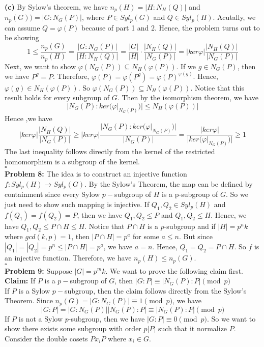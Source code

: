 \documentclass[12pt]{amsart}
\begin{document}
\\\textbf{(c)} By Sylow's theorem, we have $n_p(H)=|H:N_H(Q)|$ and $n_p(G))=|G:N_G(P)|$, where $P\in Syl_p(G)$ and $Q\in Syl_p(H)$. Acutally, we can assume $Q=\varphi(P)$ because of part 1 and 2. Hence, the problem turns out to be showing 
$$1\leq \frac{n_p(G)}{n_p(H)}=\frac{|G:N_G(P)|}{|H:N_H(Q)|}=\frac{|G|}{|H|}\cdot \frac{|N_H(Q)|}{|N_G(P)|}=|ker\varphi|\frac{|N_H(Q)|}{|N_G(P)|}$$
Next, we want to show $\varphi(N_G(P))\subseteq N_H(\varphi(P))$. If we $g\in N_G(P)$, then we have $P^g=P$. Therefore, $\varphi(P)=\varphi(P^g)=\varphi(P)^{\varphi(g)}$. Hence, $\varphi(g)\in N_H(\varphi(P))$. So $\varphi(N_G(P))\subseteq N_H(\varphi(P))$. Notice that this result holds for every subgroup of $G$. Then by the isomorphism theorem, we have 
\[|N_G(P):ker(\varphi|_{N_G(P)})|\leq N_H(\varphi(P))|\]
Hence ,we have 
\[|ker\varphi|\frac{|N_H(Q)|}{|N_G(P)|}\geq |ker\varphi|\frac{|N_G(P):ker(\varphi|_{N_G(P)})|}{|N_G(P)|}=\frac{|ker\varphi|}{|ker(\varphi|_{N_G(P)})|}\geq 1\]
The last inequality follows directly from the kernel of the restricted homomorphism is a subgroup of the kernel.
\\\phantom{qed}\hfill$\square$\\
\textbf{Problem 8:} The idea is to construct an injective function $f:Syl_p(H)\to Syl_p(G)$. By the Sylow's Theorem, the map can be defined by containment since every Sylow $p-$subgroup of $H$ is a p-subgroup of $G$. So we just need to show such mapping is injective. If $Q_1,Q_2\in Syl_p(H)$ and $f(Q_1)=f(Q_2)=P$, then we have $Q_1,Q_2\leq P$ and $Q_1,Q_2\leq H$. Hence, we have $Q_1,Q_2\leq P\cap H\leq H$. Notice that $P\cap H$ is a $p$-subgroup and if $|H|=p^nk$ where $gcd(k,p)=1$, then $|P\cap H|=p^a$ for some $a\leq n$. But since $|Q_1|=|Q_2|=p^n\leq |P\cap H|=p^a$, we have $a=n$. Hence, $Q_1=Q_2=P\cap H$. So $f$ is an injective function. Therefore, we have $n_p(H)\leq n_p(G)$. 
\\\phantom{qed}\hfill$\square$\\
\textbf{Problem 9:} Suppose $|G|=p^mk$. We want to prove the following claim first.\\
\textbf{Claim:} If $P$ is a $p-$subgroup of $G$, then $|G:P|\equiv |N_G(P):P|\pmod{p}$\\
If $P$ is a Sylow $p-$subgroup, then the claim follows directly from the Sylow's Theorem. Since $n_p(G)=|G:N_G(P)|\equiv 1\pmod{p}$, we have 
\[|G:P|=|G:N_G(P)||N_G(P):P|\equiv |N_G(P):P|\pmod{p}\]
If $P$ is not a Sylow $p$-subgroup, then we have $|G:P|\equiv 0\pmod{p}$. So we want to show there exists some subgroup with order $p|P|$ such that it normalize $P$. Consider the double cosets $Px_iP$ where $x_i\in G$.\\
\end{document}
